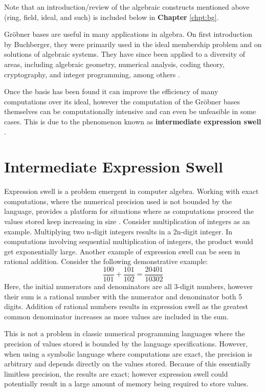 \documentclass[letterpaper,12pt,titlepage,oneside,final]{book}
\begin{document}
Note that an introduction/review of the algebraic constructs mentioned above (ring, field, ideal, and such) is included below in \textbf{Chapter} \ref{chpt:bg}.    

Gr\"obner bases are useful in many applications in algebra.  On first introduction by Buchberger, they were primarily used in the ideal membership problem and on solutions of algebraic systems.  They have since been applied to a diversity of areas, including algebraic geometry, numerical analysis, coding theory, cryptography, and integer programming, among others \cite{Adams}.   

Once the basis has been found it can improve the efficiency of many computations over its ideal, however the computation of the Gr\"obner bases themselves can be computationally intensive and can even be unfeasible in some cases.  This is due to the phenomenon known as \textbf{intermediate expression swell} \cite{Geddes}. 

\section{Intermediate Expression Swell}

Expression swell is a problem emergent in computer algebra.  Working with exact computations, where the numerical precision used is not bounded by the language, provides a platform for situations where as computations proceed the values stored keep increasing in size \cite{Geddes}.  Consider multiplication of integers as an example.  Multiplying two n-digit integers results in a 2n-digit integer.  In computations involving sequential multiplication of integers, the product would get exponentially large.  Another example of expression swell can be seen in rational addition. Consider the following demonstrative example:
\begin{equation*}
  \frac{100}{101} + \frac{101}{102} = \frac{20401}{10302}
\end{equation*}
Here, the initial numerators and denominators are all 3-digit numbers, however their sum is a rational number with the numerator and denominator both 5 digits.  Addition of rational numbers results in expression swell as the greatest common denominator increases as more values are included in the sum.

This is not a problem in classic numerical programming languages where the precision of values stored is bounded by the language specifications.  However, when using a symbolic language where computations are exact, the precision is arbitrary and depends directly on the values stored.  Because of this essentially limitless precision, the results are exact; however expression swell could potentially result in a large amount of memory being required to store values.
\end{document}
